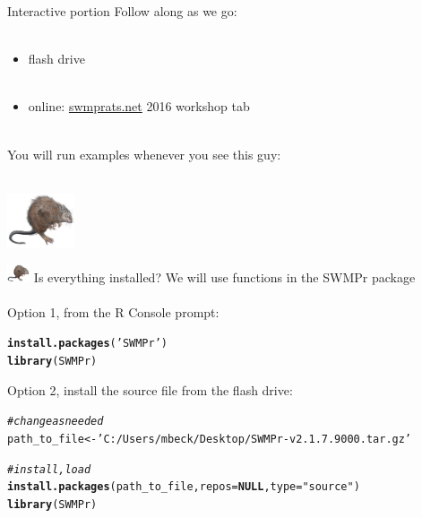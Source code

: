 \documentclass[xcolor=dvipsnames,serif]{beamer}\usepackage[]{graphicx}\usepackage[]{color}
\makeatletter
\newcommand{\hlstr}[1]{\textcolor[rgb]{0.192,0.494,0.8}{#1}}%
\newcommand{\hlcom}[1]{\textcolor[rgb]{0.678,0.584,0.686}{\textit{#1}}}%
\newcommand{\hlstd}[1]{\textcolor[rgb]{0.345,0.345,0.345}{#1}}%
\newcommand{\hlkwa}[1]{\textcolor[rgb]{0.161,0.373,0.58}{\textbf{#1}}}%
\newcommand{\hlkwb}[1]{\textcolor[rgb]{0.69,0.353,0.396}{#1}}%
\newcommand{\hlkwc}[1]{\textcolor[rgb]{0.333,0.667,0.333}{#1}}%
\newcommand{\hlkwd}[1]{\textcolor[rgb]{0.737,0.353,0.396}{\textbf{#1}}}%
\newenvironment{kframe}{%
 \def\at@end@of@kframe{}%
 \ifinner\ifhmode%
  \def\at@end@of@kframe{\end{minipage}}%
  \begin{minipage}{\columnwidth}%
 \fi\fi%
 \def\FrameCommand##1{\hskip\@totalleftmargin \hskip-\fboxsep
 \colorbox{shadecolor}{##1}\hskip-\fboxsep
     \hskip-\linewidth \hskip-\@totalleftmargin \hskip\columnwidth}%
 \MakeFramed {\advance\hsize-\width
   \@totalleftmargin\z@ \linewidth\hsize
   \@setminipage}}%
 {\par\unskip\endMakeFramed%
 \at@end@of@kframe}
\newenvironment{knitrout}{}{} %
\makeatother
\begin{document}
\begin{frame}{Interactive portion}
\onslide<+->
Follow along as we go:\\~\\
\begin{itemize}
\item flash drive\\~\\
\item online: \href{http://swmprats.net/}{swmprats.net} 2016 workshop tab \\~\\
\end{itemize}
\onslide<+->
You will run examples whenever you see this guy: \\~\\
\centerline{\includegraphics[width = 0.15\textwidth]{imgs/swmprat.png}} 
\end{frame}

\begin{frame}[fragile]{\includegraphics[width = 0.05\textwidth]{imgs/swmprat.png} Is everything installed?}
We will use functions in the SWMPr package \\~\\
Option 1, from the R Console prompt:
\begin{knitrout}\scriptsize
{}\color{fgcolor}\begin{kframe}
\begin{alltt}
\hlkwd{install.packages}\hlstd{(}\hlstr{'SWMPr'}\hlstd{)}
\hlkwd{library}\hlstd{(SWMPr)}
\end{alltt}
\end{kframe}
\end{knitrout}
\vspace{0.1in}
Option 2, install the source file from the flash drive:
\begin{knitrout}\scriptsize
{}\color{fgcolor}\begin{kframe}
\begin{alltt}
\hlcom{# change as needed}
\hlstd{path_to_file} \hlkwb{<-} \hlstr{'C:/Users/mbeck/Desktop/SWMPr-v2.1.7.9000.tar.gz'}

\hlcom{# install, load}
\hlkwd{install.packages}\hlstd{(path_to_file,} \hlkwc{repos} \hlstd{=} \hlkwa{NULL}\hlstd{,} \hlkwc{type}\hlstd{=}\hlstr{"source"}\hlstd{)}
\hlkwd{library}\hlstd{(SWMPr)}
\end{alltt}
\end{kframe}
\end{knitrout}
\end{frame}
\end{document}
